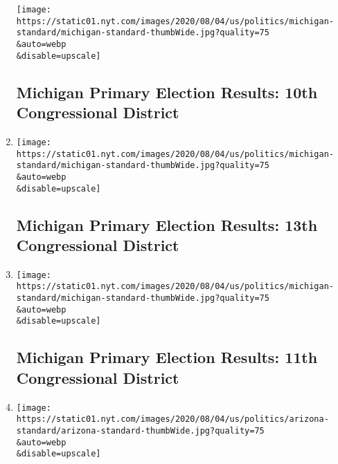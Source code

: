 \begin{enumerate}
  \texttt{[image: https://static01.nyt.com/images/2020/08/04/us/politics/michigan-standard/michigan-standard-thumbWide.jpg?quality=75\\\&auto=webp\\\&disable=upscale]}

  \hypertarget{michigan-primary-election-results-10th-congressional-district}{%
  \subsection{Michigan Primary Election Results: 10th Congressional
  District}\label{michigan-primary-election-results-10th-congressional-district}}
\item
  \href{/interactive/2020/08/04/us/elections/results-michigan-house-district-13-primary-election.html}{}

  \texttt{[image: https://static01.nyt.com/images/2020/08/04/us/politics/michigan-standard/michigan-standard-thumbWide.jpg?quality=75\\\&auto=webp\\\&disable=upscale]}

  \hypertarget{michigan-primary-election-results-13th-congressional-district}{%
  \subsection{Michigan Primary Election Results: 13th Congressional
  District}\label{michigan-primary-election-results-13th-congressional-district}}
\item
  \href{/interactive/2020/08/04/us/elections/results-michigan-house-district-11-primary-election.html}{}

  \texttt{[image: https://static01.nyt.com/images/2020/08/04/us/politics/michigan-standard/michigan-standard-thumbWide.jpg?quality=75\\\&auto=webp\\\&disable=upscale]}

  \hypertarget{michigan-primary-election-results-11th-congressional-district}{%
  \subsection{Michigan Primary Election Results: 11th Congressional
  District}\label{michigan-primary-election-results-11th-congressional-district}}
\item
  \href{/interactive/2020/08/04/us/elections/results-arizona-house-district-2-primary-election.html}{}

  \texttt{[image: https://static01.nyt.com/images/2020/08/04/us/politics/arizona-standard/arizona-standard-thumbWide.jpg?quality=75\\\&auto=webp\\\&disable=upscale]}

  \hypertarget{arizona-primary-election-results-second-congressional-district}{%
}
\end{enumerate}
